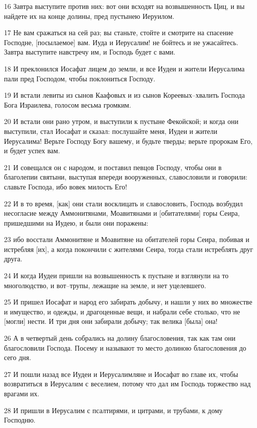 \par 16 Завтра выступите против них: вот они всходят на возвышенность Циц, и вы найдете их на конце долины, пред пустынею Иеруилом.
\par 17 Не вам сражаться на сей раз; вы станьте, стойте и смотрите на спасение Господне, [посылаемое] вам. Иуда и Иерусалим! не бойтесь и не ужасайтесь. Завтра выступите навстречу им, и Господь будет с вами.
\par 18 И преклонился Иосафат лицем до земли, и все Иудеи и жители Иерусалима пали пред Господом, чтобы поклониться Господу.
\par 19 И встали левиты из сынов Каафовых и из сынов Кореевых--хвалить Господа Бога Израилева, голосом весьма громким.
\par 20 И встали они рано утром, и выступили к пустыне Фекойской; и когда они выступили, стал Иосафат и сказал: послушайте меня, Иудеи и жители Иерусалима! Верьте Господу Богу вашему, и будьте тверды; верьте пророкам Его, и будет успех вам.
\par 21 И совещался он с народом, и поставил певцов Господу, чтобы они в благолепии святыни, выступая впереди вооруженных, славословили и говорили: славьте Господа, ибо вовек милость Его!
\par 22 И в то время, [как] они стали восклицать и славословить, Господь возбудил несогласие между Аммонитянами, Моавитянами и [обитателями] горы Сеира, пришедшими на Иудею, и были они поражены:
\par 23 ибо восстали Аммонитяне и Моавитяне на обитателей горы Сеира, побивая и истребляя [их], а когда покончили с жителями Сеира, тогда стали истреблять друг друга.
\par 24 И когда Иудеи пришли на возвышенность к пустыне и взглянули на то многолюдство, и вот--трупы, лежащие на земле, и нет уцелевшего.
\par 25 И пришел Иосафат и народ его забирать добычу, и нашли у них во множестве и имущество, и одежды, и драгоценные вещи, и набрали себе столько, что не [могли] нести. И три дня они забирали добычу; так велика [была] она!
\par 26 А в четвертый день собрались на долину благословения, так как там они благословили Господа. Посему и называют то место долиною благословения до сего дня.
\par 27 И пошли назад все Иудеи и Иерусалимляне и Иосафат во главе их, чтобы возвратиться в Иерусалим с веселием, потому что дал им Господь торжество над врагами их.
\par 28 И пришли в Иерусалим с псалтирями, и цитрами, и трубами, к дому Господню.
